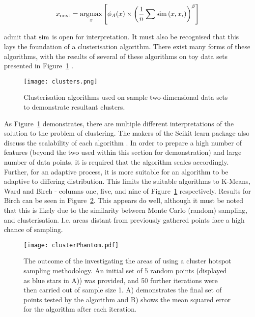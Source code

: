 \begin{equation}
    \label{eq:Settles_density}
    x_\mathrm{next}=\operatorname*{argmax}_x{\left[\phi_A(x)\times{\left(\frac{1}{n}\sum{\operatorname*{sim}{(x, x_i)}}\right)}^\beta\right]}
\end{equation}

\textcite{Set08} admit that $\operatorname*{sim}$ is open for interpretation. It must also be recognised that this lays the foundation of a clusterisation algorithm. There exist many forms of these algorithms, with the results of several of these algorithms on toy data sets presented in Figure~\ref{fig:ClusterResults} \cite{SciClus}.

\begin{figure}[H]
    \begin{center}
        \texttt{[image: clusters.png]}
        \caption[Comparison of Clusterisation Algorithms]{Clusterisation algorithms used on sample two-dimensional data sets to demonstrate resultant clusters.}
        \label{fig:ClusterResults}
    \end{center}
\end{figure}

As Figure~\ref{fig:ClusterResults} demonstrates, there are multiple different interpretations of the solution to the problem of clustering. The makers of the Scikit learn package also discuss the scalability of each algorithm \cite{SciClus}. In order to prepare a high number of features (beyond the two used within this section for demonstration) and large number of data points, it is required that the algorithm scales accordingly. Further, for an adaptive process, it is more suitable for an algorithm to be adaptive to differing distribution. This limits the suitable algorithms to K-Means, Ward and Birch - columns one, five, and nine of Figure~\ref{fig:ClusterResults} respectively. Results for Birch can be seen in Figure~\ref{fig:clusterPhantom}. This appears do well, although it must be noted that this is likely due to the similarity between Monte Carlo (random) sampling, and clusterisation. I.e. areas distant from previously gathered points face a high chance of sampling.

\begin{figure}[H]
    \begin{center}
        \texttt{[image: clusterPhantom.pdf]}
        \caption[Cluster Hotspot Sampling Illustration]{The outcome of the investigating the areas of using a cluster hotspot sampling methodology. An initial set of 5 random points (displayed as blue stars in A)) was provided, and 50 further iterations were then carried out of sample size 1. A) demonstrates the final set of points tested by the algorithm and B) shows the mean squared error for the algorithm after each iteration.}
        \label{fig:clusterPhantom}
    \end{center}
\end{figure}

